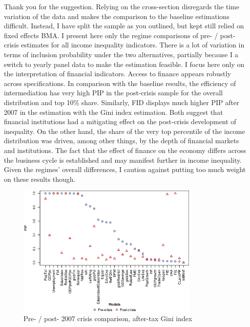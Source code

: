 \begin{enumerate}[resume]
    Thank you for the suggestion. Relying on the cross-section disregards the time variation of the data and makes the comparison to the baseline estimations difficult. Instead, I have split the sample as you outlined, but kept still relied on fixed effects \ac{BMA}. I present here only the regime comparisons of pre- / post- crisis estimates for all income inequality indicators. There is a lot of variation in terms of inclusion probability under the two alternatives, partially because I a switch to yearly panel data to make the estimation feasible. I focus here only on the interpretation of financial indicators. Access to finance appears robustly across specifications. In comparison with the baseline results, the efficiency of intermediation has very high \ac{PIP} in the post-crisis sample for the overall distribution and top 10\% share. Similarly, FID displays much higher \ac{PIP} after 2007 in the estimation with the Gini index estimation. Both suggest that financial institutions had a mitigating effect on the post-crisis development of inequality. On the other hand, the share of the very top percentile of the income distribution was driven, among other things, by the depth of financial markets and institutions. The fact that the effect of finance on the economy differs across the business cycle is established \parencite{braun2005finance,DellAricciaetal2008} and may manifest further in income inequality. Given the regimes' overall differences, I caution against putting too much weight on these results though.
    
    \begin{figure}[ht!]
      \caption{Pre- / post- 2007 crisis comparison, after-tax Gini index}
      \label{ch4fig:comp_prepostcrisis_gini}
      \centering
      \includegraphics[width=0.8\textwidth, keepaspectratio]{Figures/ch4/comp_prepostcrisis_gini}
    \end{figure}


\end{enumerate}

